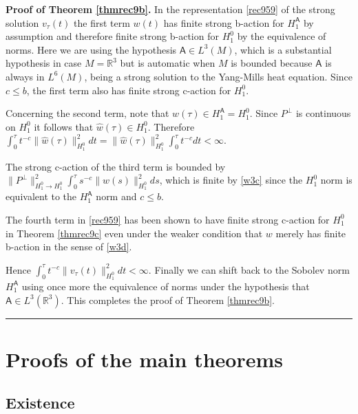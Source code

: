 \documentclass[12pt]{article}
\newenvironment{proof}[1][Proof]{\textbf{#1.} }{\ \rule{0.5em}{0.5em}}
\def \R{\mathbb R}
\def \As{\mathsf{A}}
\def \eref{\eqref}
\numberwithin{equation}{section}
\begin{document}
\bigskip
\noindent
\begin{proof}[Proof of Theorem \ref{thmrec9b}]  
 In the representation  \eref{rec959}  of the strong solution  $v_\tau(t)$ 
 the first term  $w(t)$ has 
 finite strong b-action  for $H_1^\As$ by assumption
  and therefore  
   finite strong  b-action for $H_1^0$ by the equivalence of norms.
  Here we are using the hypothesis $\As \in L^3(M)$,
 which is a substantial hypothesis in case $M = \R^3$ but is automatic when $M$ is bounded because
 $\As$ is always in $L^6(M)$, being a strong solution to the Yang-Mills heat equation.
 Since $c \le b$, the first term also has finite strong c-action for $H_1^0$.

Concerning the second term, note that $w(\tau) \in H_1^\As = H_1^0$. Since $P^\perp$ is continuous
on $H_1^0$ it follows  that $\hat w(\tau) \in H_1^0$. 
 Therefore 
 $\int_0^\tau t^{-c} \| \hat w(\tau)\|_{H_1^0}^2 dt = \| \hat w(\tau)\|_{H_1^0}^2 \int_0^\tau t^{-c} dt < \infty$.
 
 The strong c-action of the third   term is bounded by \linebreak 
 $\|P^\perp\|_{H_1^0 \rightarrow H_1^ 0}^2
 \int_0^\tau s^{-c} \| w(s)\|_{H_1^0}^2 ds$, which is finite   by  \eref{w3c} 
 since the $H_1^0$ norm is equivalent to the $H_1^\As$ norm and  $c \le b$.
 
 The fourth term in \eref{rec959} has been shown to have 
 finite strong c-action for $H_1^0$ in 
 Theorem \ref{thmrec9c}    even under the weaker condition that $w$ merely 
 has finite b-action   in the sense  of \eref{w3d}.  
 
 Hence
 $\int_0^\tau t^{-c} \| v_\tau(t)\|_{H_1^0}^2 dt < \infty$. Finally we can shift back to the Sobolev
 norm $H_1^\As$ using once more the equivalence of norms under the
  hypothesis that $\As \in L^3(\R^3)$. This completes the proof of Theorem \ref{thmrec9b}.
\end{proof}






\section{Proofs of the main theorems} \label{secrecpf}
\subsection{Existence}
\end{document}
